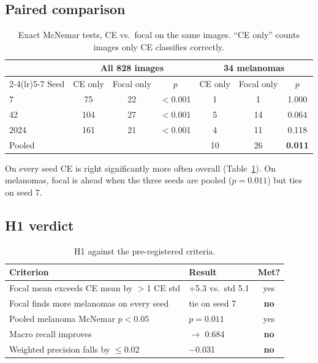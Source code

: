 \documentclass[conference]{IEEEtran}
\begin{document}
\subsection{Paired comparison}
\begin{table}[t]
\caption{Exact McNemar tests, CE vs.\ focal on the same images. ``CE only'' counts images only CE classifies correctly.}
\label{tab:mcnemar}
\centering
\footnotesize
\setlength{\tabcolsep}{3pt}
\begin{tabular}{lcccccc}
\toprule
& \multicolumn{3}{c}{All 828 images} & \multicolumn{3}{c}{34 melanomas}\\
\cmidrule(lr){2-4}\cmidrule(lr){5-7}
Seed & CE only & Focal only & $p$ & CE only & Focal only & $p$\\
\midrule
7 & 75 & 22 & $<$0.001 & 1 & 1 & 1.000\\
42 & 104 & 27 & $<$0.001 & 5 & 14 & 0.064\\
2024 & 161 & 21 & $<$0.001 & 4 & 11 & 0.118\\
\midrule
Pooled & & & & 10 & 26 & \textbf{0.011}\\
\bottomrule
\end{tabular}
\end{table}

On every seed CE is right significantly more often overall (Table~\ref{tab:mcnemar}). On melanomas, focal is ahead when the three seeds are pooled ($p=0.011$) but ties on seed 7.

\subsection{H1 verdict}
\begin{table}[t]
\caption{H1 against the pre-registered criteria.}
\label{tab:verdict}
\centering
\footnotesize
\setlength{\tabcolsep}{3pt}
\begin{tabular}{>{\raggedright\arraybackslash}p{}>{\raggedright\arraybackslash}p{}c}
\toprule
Criterion & Result & Met?\\
\midrule
Focal mean exceeds CE mean by $>$1 CE std & +5.3 vs.\ std 5.1 & yes\\
Focal finds more melanomas on every seed & tie on seed 7 & \textbf{no}\\
Pooled melanoma McNemar $p<0.05$ & $p=0.011$ & yes\\
Macro recall improves & 0.755 $\rightarrow$ 0.684 & \textbf{no}\\
Weighted precision falls by $\leq$0.02 & $-$0.031 & \textbf{no}\\
\bottomrule
\end{tabular}
\end{table}
\end{document}
